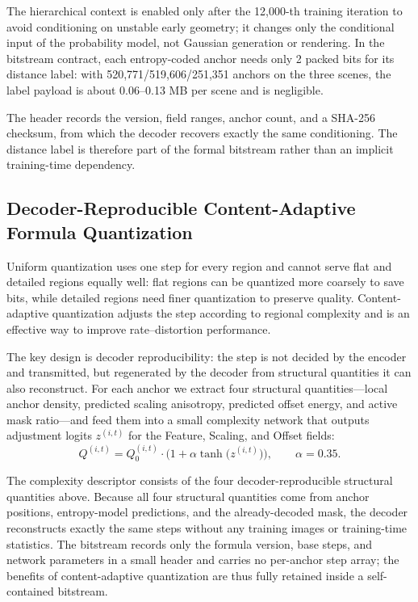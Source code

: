 \documentclass[conference]{IEEEtran}
\begin{document}
The hierarchical context is enabled only after the 12,000-th training
iteration to avoid conditioning on unstable early geometry; it changes
only the conditional input of the probability model, not Gaussian
generation or rendering. In the bitstream contract, each entropy-coded
anchor needs only 2 packed bits for its distance label: with
520,771/519,606/251,351 anchors on the three scenes, the label payload
is about 0.06--0.13 MB per scene and is negligible.

The header records the version, field ranges, anchor count, and a
SHA-256 checksum, from which the decoder recovers exactly the same
conditioning. The distance label is therefore part of the formal
bitstream rather than an implicit training-time dependency.

\subsection{Decoder-Reproducible Content-Adaptive Formula Quantization}
Uniform quantization uses one step for every region and cannot serve
flat and detailed regions equally well: flat regions can be quantized
more coarsely to save bits, while detailed regions need finer
quantization to preserve quality. Content-adaptive quantization adjusts
the step according to regional complexity and is an effective way to
improve rate--distortion performance.

The key design is decoder reproducibility: the step is not decided by
the encoder and transmitted, but regenerated by the decoder from
structural quantities it can also reconstruct. For each anchor we
extract four structural quantities---local anchor density, predicted
scaling anisotropy, predicted offset energy, and active mask ratio---and
feed them into a small complexity network that outputs adjustment logits
$z^{(i,t)}$ for the Feature, Scaling, and Offset fields:
\begin{equation}
Q^{(i,t)} = Q_{0}^{(i,t)} \cdot \bigl(1 + \alpha\tanh\bigl(z^{(i,t)}\bigr)\bigr),
\qquad \alpha = 0.35.
\label{eq:qstep}
\end{equation}

The complexity descriptor consists of the four decoder-reproducible
structural quantities above. Because all four structural quantities come
from anchor positions, entropy-model predictions, and the already-decoded
mask, the decoder reconstructs exactly the same steps without any
training images or training-time statistics. The bitstream records only
the formula version, base steps, and network parameters in a small
header and carries no per-anchor step array; the benefits of
content-adaptive quantization are thus fully retained inside a
self-contained bitstream.
\end{document}
